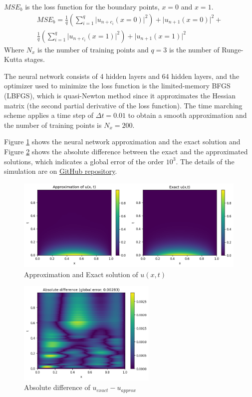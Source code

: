 \documentclass[a4paper,12pt]{article}
\theoremstyle{definition}
\begin{document}
$MSE_b$ is the loss function for the boundary points, $x=0$ and $x=1$.
\begin{multline}
MSE_b = \frac{1}{q} \left( \sum_{i=1}^{q} \Big| u_{n+c_i}(x=0) \Big|^2  \right)
+ \Big| u_{n+1}(x=0) \Big|^2 + \\
\frac{1}{q} \left( \sum_{i=1}^{q} \Big| u_{n+c_i}(x=1) \Big|^2  \right)
+ \Big| u_{n+1}(x=1) \Big|^2
\end{multline}
Where $N_x$ is the number of training points and $q = 3$ is the number of Runge-Kutta stages.

The neural network consists of 4 hidden layers and 64 hidden layers, and the optimizer used to
minimize the loss function is the limited-memory BFGS (LBFGS), which is quasi-Newton method since 
it approximates the Hessian matrix (the second partial derivative of the loss function). The time
marching scheme applies a time step of $\Delta t = 0.01$ to obtain a smooth approximation and the number
of training points is $N_x = 200$.

Figure \ref{exact_approximation_diffusion_RK} shows the neural network approximation and the exact solution 
and Figure \ref{abs_diff_disc_pinn_diffusion} shows the absolute difference between the exact and the approximated
solutions, which indicates a global error of the order $10^3$. The details of the simulation are on 
\href{https://github.com/HashimAlSadah/MX-Project/blob/main/PINN/discrete_time_model/Discrete_time_PINN_Diffusion_equation.ipynb}
{GitHub repository}.


\begin{figure}[H]
    \centering
    \includegraphics[width=420px]{images/diffusion_ex_app_dis_PINN.png}
    \vspace{-1em}
    \caption{Approximation and Exact solution of $u(x,t)$}
    \label{exact_approximation_diffusion_RK}
\end{figure}

\begin{figure}[H]
    \centering
    \includegraphics[width=250px]{images/abs_difference_disc_PINN_diffusion.png}
    \vspace{-1em}
    \caption{Absolute difference of $u_{exact} - u_{approx}$}
    \label{abs_diff_disc_pinn_diffusion}
\end{figure}
\end{document}
